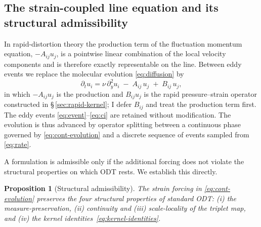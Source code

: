 \documentclass[lineno]{JFM-FLM_Au}
\newtheorem{proposition}{Proposition}
\begin{document}
\subsection{The strain-coupled line equation and its structural
admissibility}\label{sec:strain-forcing}

In rapid-distortion theory the production term of the fluctuation momentum
equation, $-A_{ij}u_j$, is a pointwise linear combination of the local
velocity components and is therefore exactly representable on the line.
Between eddy events we replace the molecular evolution
\eqref{eq:diffusion} by
\begin{equation}
  \partial_t u_i
  = \nu\,\partial_y^2 u_i \;-\; A_{ij}\,u_j \;+\; B_{ij}\,u_j,
  \label{eq:cont-evolution}
\end{equation}
in which $-A_{ij}u_j$ is the production and $B_{ij}u_j$ is the rapid
pressure--strain operator constructed in \S\,\ref{sec:rapid-kernel}; I
defer $B_{ij}$ and treat the production term first. The eddy events
\eqref{eq:event}--\eqref{eq:ci} are retained without modification. The
evolution is thus advanced by operator splitting between a continuous phase
governed by \eqref{eq:cont-evolution} and a discrete sequence of events
sampled from \eqref{eq:rate}.

A formulation is admissible only if the additional forcing does not
violate the structural properties on which ODT rests. We establish this
directly.

\begin{proposition}[Structural admissibility]\label{prop:admissibility}
The strain forcing in \eqref{eq:cont-evolution} preserves the four
structural properties of standard ODT: \emph{(i)} the measure-preservation,
\emph{(ii)} continuity and \emph{(iii)} scale-locality of the triplet map,
and \emph{(iv)} the kernel identities~\eqref{eq:kernel-identities}.
\end{proposition}
\end{document}
